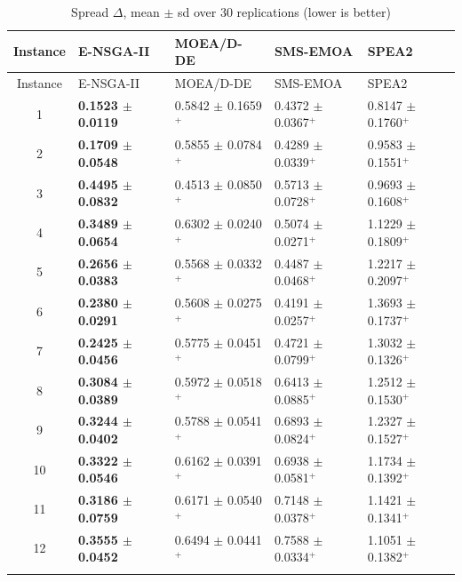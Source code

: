 \documentclass[11pt, a4paper]{article}
\begin{document}
\hypertarget{tab:Spread}{}
\begin{longtable}[!htb]{@{}cllll@{}}
\caption{Spread $\Delta$, mean $\pm$ sd over 30 replications (lower is better)}\tabularnewline
\toprule
Instance & E-NSGA-II & MOEA/D-DE & SMS-EMOA & SPEA2\tabularnewline
\midrule
\endfirsthead
\toprule
Instance & E-NSGA-II & MOEA/D-DE & SMS-EMOA & SPEA2\tabularnewline
\midrule
\endhead
1 & \textbf{0.1523 $\pm$ 0.0119} & 0.5842 $\pm$ 0.1659$^{+}$ & 0.4372 $\pm$ 0.0367$^{+}$ & 0.8147 $\pm$ 0.1760$^{+}$\tabularnewline
2 & \textbf{0.1709 $\pm$ 0.0548} & 0.5855 $\pm$ 0.0784$^{+}$ & 0.4289 $\pm$ 0.0339$^{+}$ & 0.9583 $\pm$ 0.1551$^{+}$\tabularnewline
3 & \textbf{0.4495 $\pm$ 0.0832} & 0.4513 $\pm$ 0.0850$^{+}$ & 0.5713 $\pm$ 0.0728$^{+}$ & 0.9693 $\pm$ 0.1608$^{+}$\tabularnewline
4 & \textbf{0.3489 $\pm$ 0.0654} & 0.6302 $\pm$ 0.0240$^{+}$ & 0.5074 $\pm$ 0.0271$^{+}$ & 1.1229 $\pm$ 0.1809$^{+}$\tabularnewline
5 & \textbf{0.2656 $\pm$ 0.0383} & 0.5568 $\pm$ 0.0332$^{+}$ & 0.4487 $\pm$ 0.0468$^{+}$ & 1.2217 $\pm$ 0.2097$^{+}$\tabularnewline
6 & \textbf{0.2380 $\pm$ 0.0291} & 0.5608 $\pm$ 0.0275$^{+}$ & 0.4191 $\pm$ 0.0257$^{+}$ & 1.3693 $\pm$ 0.1737$^{+}$\tabularnewline
7 & \textbf{0.2425 $\pm$ 0.0456} & 0.5775 $\pm$ 0.0451$^{+}$ & 0.4721 $\pm$ 0.0799$^{+}$ & 1.3032 $\pm$ 0.1326$^{+}$\tabularnewline
8 & \textbf{0.3084 $\pm$ 0.0389} & 0.5972 $\pm$ 0.0518$^{+}$ & 0.6413 $\pm$ 0.0885$^{+}$ & 1.2512 $\pm$ 0.1530$^{+}$\tabularnewline
9 & \textbf{0.3244 $\pm$ 0.0402} & 0.5788 $\pm$ 0.0541$^{+}$ & 0.6893 $\pm$ 0.0824$^{+}$ & 1.2327 $\pm$ 0.1527$^{+}$\tabularnewline
10 & \textbf{0.3322 $\pm$ 0.0546} & 0.6162 $\pm$ 0.0391$^{+}$ & 0.6938 $\pm$ 0.0581$^{+}$ & 1.1734 $\pm$ 0.1392$^{+}$\tabularnewline
11 & \textbf{0.3186 $\pm$ 0.0759} & 0.6171 $\pm$ 0.0540$^{+}$ & 0.7148 $\pm$ 0.0378$^{+}$ & 1.1421 $\pm$ 0.1341$^{+}$\tabularnewline
12 & \textbf{0.3555 $\pm$ 0.0452} & 0.6494 $\pm$ 0.0441$^{+}$ & 0.7588 $\pm$ 0.0334$^{+}$ & 1.1051 $\pm$ 0.1382$^{+}$\tabularnewline
\bottomrule
\label{tab:Spread}
\end{longtable}
\protect\hypertarget{tab:Spread}{}{}
\end{document}
